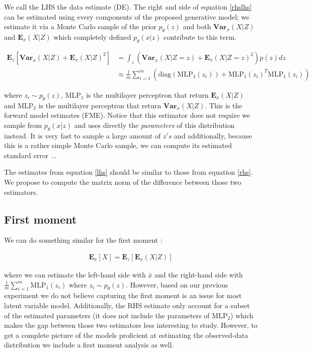 \documentclass{article}
\newcommand{\Vx}{\textbf{Var}_x}
\newcommand{\Ex}{\textbf{E}_x}
\newcommand{\Ez}{\textbf{E}_z}
\begin{document}
We call the LHS the data estimate (DE). The right and side of equation \ref{rhslhs} can be estimated using every components of the proposed generative model; we estimate it via a Monte Carlo sample of the prior $p_\theta(z)$ and both $\Vx(X|Z)$ and $\Ex(X|Z)$ which completely defined $p_\theta(x|z)$ contribute to this term. 

\begin{align}
\Ez[\Vx(X|Z) + \Ex(X|Z)^2] &= \int_z (\Vx(X|Z=z)+\Ex(X|Z=z)^2)p(z) dz \\ 
&\approx \frac{1}{m} \sum_{i=1}^m ( \text{diag}(\text{MLP}_2(z_i)) + \text{MLP}_1(z_i)^T\text{MLP}_1(z_i))
\label{rhs}
\end{align}

where $z_i \sim p_\theta(z)$, MLP$_1$ is the multilayer perceptron that return $\Ex(X|Z)$ and MLP$_2$ is the multilayer perceptron that return $\Vx(X|Z)$. This is the forward model estimates (FME). Notice that this estimator does not require we sample from $p_\theta(x|z)$ and uses directly the \textit{parameters} of this distribution instead. It is very fast to sample a large amount of $z's$ and additionally, because this is a rather simple Monte Carlo sample, we can compute its estimated standard error ...

\bigskip

The estimates from equation \ref{lhs} should be similar to those from equation \ref{rhs}. We propose to compute the matrix norm of the difference between those two estimators.

\subsection{First moment}

We can do something similar for the first moment :

\begin{align}
\Ex[X] = \Ez[\Ex(X|Z)] 
\label{rhs}
\end{align}

where we can estimate the left-hand side with $\bar{x}$ and the right-hand side with $\frac{1}{m} \sum_{i=1}^m \text{MLP}_1(z_i)$ where $z_i \sim p_\theta(z)$. However, based on our previous experiment we do not believe capturing the first moment is an issue for most latent variable model. Additionally, the RHS estimate only account for a subset of the estimated parameters (it does not include the parameters of MLP$_2$) which makes the gap between those two estimators less interesting to study. However, to get a complete picture of the models proficient at estimating the observed-data distribution we include a first moment analysis as well. 
\end{document}
